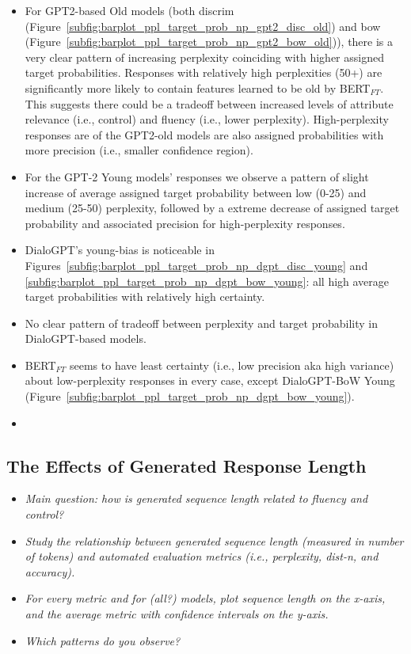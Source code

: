 \begin{itemize}
    \item For GPT2-based Old models (both discrim (Figure~\ref{subfig:barplot_ppl_target_prob_np_gpt2_disc_old}) and bow (Figure~\ref{subfig:barplot_ppl_target_prob_np_gpt2_bow_old})), there is a very clear pattern of increasing perplexity coinciding with higher assigned target probabilities. Responses with relatively high perplexities (50+) are significantly more likely to contain features learned to be old by BERT$_{FT}$. This suggests there could be a tradeoff between increased levels of attribute relevance (i.e., control) and fluency (i.e., lower perplexity). High-perplexity responses are of the GPT2-old models are also assigned probabilities with more precision (i.e., smaller confidence region).
    \item For the GPT-2 Young models' responses we observe a pattern of slight increase of average assigned target probability between low (0-25) and medium (25-50) perplexity, followed by a extreme decrease of assigned target probability and associated precision for high-perplexity responses.
    \item DialoGPT's young-bias is noticeable in Figures~\ref{subfig:barplot_ppl_target_prob_np_dgpt_disc_young} and \ref{subfig:barplot_ppl_target_prob_np_dgpt_bow_young}: all high average target probabilities with relatively high certainty.
    \item No clear pattern of tradeoff between perplexity and target probability in DialoGPT-based models.
    \item BERT$_{FT}$ seems to have least certainty (i.e., low precision aka high variance) about low-perplexity responses in every case, except DialoGPT-BoW Young (Figure~\ref{subfig:barplot_ppl_target_prob_np_dgpt_bow_young}).
    \item {}
\end{itemize}


\subsection{The Effects of Generated Response Length }

\begin{itemize}
    \item \textit{Main question: how is generated sequence length related to fluency and control?}
    
    \item \textit{Study the relationship between generated sequence length (measured in number of tokens) and automated evaluation metrics (i.e., perplexity, dist-n, and accuracy).}
    
    \item \textit{For every metric and for (all?) models, plot sequence length on the x-axis, and the average metric with confidence intervals on the y-axis.}
    
    \item \textit{Which patterns do you observe?} 
\end{itemize}

